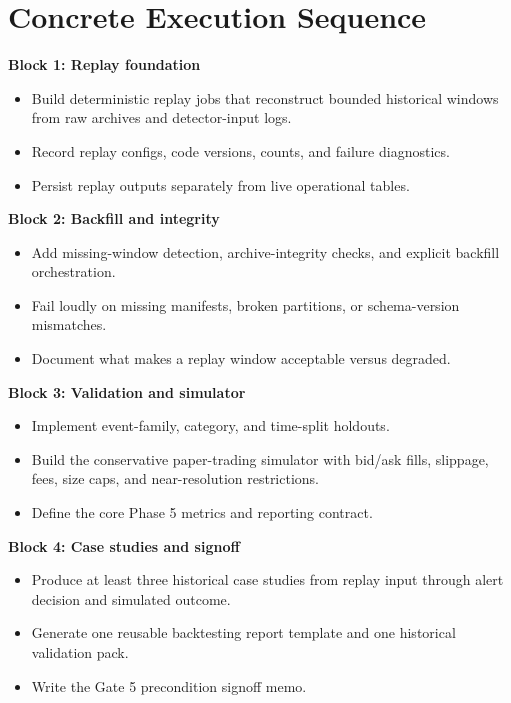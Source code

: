 \documentclass{article}
\begin{document}
\section*{Concrete Execution Sequence}
\textbf{Block 1: Replay foundation}
\begin{itemize}
\item Build deterministic replay jobs that reconstruct bounded historical windows from raw archives and detector-input logs.
\item Record replay configs, code versions, counts, and failure diagnostics.
\item Persist replay outputs separately from live operational tables.
\end{itemize}

\textbf{Block 2: Backfill and integrity}
\begin{itemize}
\item Add missing-window detection, archive-integrity checks, and explicit backfill orchestration.
\item Fail loudly on missing manifests, broken partitions, or schema-version mismatches.
\item Document what makes a replay window acceptable versus degraded.
\end{itemize}

\textbf{Block 3: Validation and simulator}
\begin{itemize}
\item Implement event-family, category, and time-split holdouts.
\item Build the conservative paper-trading simulator with bid/ask fills, slippage, fees, size caps, and near-resolution restrictions.
\item Define the core Phase 5 metrics and reporting contract.
\end{itemize}

\textbf{Block 4: Case studies and signoff}
\begin{itemize}
\item Produce at least three historical case studies from replay input through alert decision and simulated outcome.
\item Generate one reusable backtesting report template and one historical validation pack.
\item Write the Gate 5 precondition signoff memo.
\end{itemize}
\end{document}
